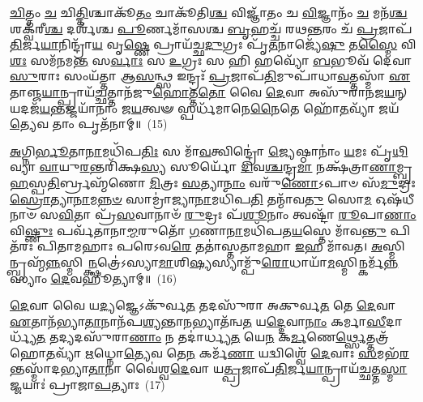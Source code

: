 {\anuvakamend[{𑌯𑌥𑍍𑌸𑍍𑌵𑍇𑌨᳴ 𑌸𑌾𑌰\-\ul{𑌸𑍍𑌵}\-𑌤𑍀𑌮𑌾 𑌲᳴𑌭𑍇\-\ul{𑌤} 𑌯𑌃 𑌕𑌾𑌮𑌾᳴𑌯 \ul{𑌤𑍍𑌵𑌾} 𑌕𑌾𑌮𑍋\-𑌽\-\ul{𑌪} 𑌇\-\ul{𑌤𑍍𑌯}\-𑌭𑍍𑌰𑍋 𑌦𑍍𑌵𑌿𑌚᳴𑌤𑍍𑌵𑌾𑌰𑌿𑍞𑌶𑌚𑍍𑌚}]}%

\-\ul{𑌚𑌿}\-𑌤𑍍𑌤𑌂 \ul{𑌚} 𑌚𑌿\-\ul{𑌤𑍍𑌤𑌿}\-𑌶𑍍𑌚𑌾𑌕𑍂᳴\-\ul{𑌤𑌂} 𑌚𑌾𑌕𑍂᳴𑌤𑌿\-\ul{𑌶𑍍𑌚} 𑌵𑌿𑌜𑍍𑌞𑌾᳴𑌤𑌂 𑌚 \ul{𑌵𑌿}\-𑌜𑍍𑌞𑌾𑌨𑌂᳴ \ul{𑌚} 𑌮𑌨᳴\-\ul{𑌶𑍍𑌚} 𑌶𑌕𑍍𑌵᳴𑌰𑍀\-\ul{𑌶𑍍𑌚} 𑌦𑌰𑍍\mbox{}𑌶᳴𑌶𑍍𑌚 \ul{𑌪𑍂}\-𑌰𑍍𑌣𑌮𑌾᳴𑌸𑌶𑍍𑌚 \ul{𑌬𑍃}\-𑌹𑌚𑍍𑌚᳴ 𑌰𑌥\-\ul{𑌨𑍍𑌤}\-𑌰𑌂 𑌚᳴ \ul{𑌪𑍍𑌰}\-𑌜𑌾𑌪᳴\-\ul{𑌤𑌿}\-𑌰𑍍𑌜\-\ul{𑌯𑌾}\-𑌨𑌿𑌨𑍍𑌦𑍍𑌰𑌾᳴\-\ul{𑌯} 𑌵𑍃\-\ul{𑌷𑍍𑌣𑍇} 𑌪𑍍𑌰𑌾𑌯᳴𑌚𑍍𑌛\-\ul{𑌦𑍁}\-𑌗𑍍𑌰𑌃 𑌪𑍃᳴\-\ul{𑌤}\-𑌨𑌾𑌜𑍍𑌯𑍇᳴\-\ul{𑌷𑍁} 𑌤\-\ul{𑌸𑍍𑌮𑍈} 𑌵𑌿\-\ul{𑌶𑌃} 𑌸𑌮᳴𑌨𑌮\-\ul{𑌨𑍍𑌤} 𑌸\-\ul{𑌰𑍍𑌵𑌾𑌃} 𑌸 \ul{𑌉}\-𑌗𑍍𑌰𑌃 𑌸 𑌹𑌿 𑌹𑌵𑍍𑌯𑍋᳴ \ul{𑌬}\-𑌭𑍂𑌵᳴ 𑌦𑍇𑌵𑌾\-\ul{𑌸𑍁}\-𑌰𑌾𑌃 𑌸𑌂𑌯᳴𑌤𑍍𑌤𑌾 𑌆\-\ul{𑌸}\-𑌨𑍍𑌥𑍍𑌸 𑌇𑌨𑍍𑌦𑍍𑌰𑌃᳴ \ul{𑌪𑍍𑌰}\-𑌜𑌾𑌪᳴\-\ul{𑌤𑌿}\-𑌮𑍁𑌪𑌾᳴𑌧𑌾\-\ul{𑌵}\-𑌤𑍍𑌤𑌸𑍍𑌮𑌾᳴ \ul{𑌏}\-𑌤𑌾𑌞𑍍𑌜\-\ul{𑌯𑌾}\-𑌨𑍍𑌪𑍍𑌰𑌾𑌯᳴\-\ul{𑌚𑍍𑌛}\-𑌤𑍍𑌤𑌾𑌨᳴𑌜𑍁\-\ul{𑌹𑍋}\-𑌤𑍍𑌤\-\ul{𑌤𑍋} 𑌵𑍈 \ul{𑌦𑍇}\-𑌵𑌾 𑌅𑌸𑍁᳴𑌰𑌾𑌨𑌜\-\ul{𑌯}\-𑌨𑍍 𑌯\-𑌦𑌜᳴\-\ul{𑌯}\-𑌨𑍍𑌤𑌜𑍍𑌜𑌯𑌾᳴𑌨𑌾𑌂 𑌜\-\ul{𑌯}\-𑌤𑍍𑌵𑍟 𑌸𑍍𑌪𑌰𑍍𑌧᳴𑌮𑌾𑌨𑍇\-\ul{𑌨𑍈}\-𑌤𑍇 𑌹𑍋᳴\-\ul{𑌤}\-𑌵𑍍𑌯𑌾᳴ 𑌜𑌯᳴\-\ul{𑌤𑍍𑌯𑍇}\-𑌵 𑌤𑌾𑌂 𑌪𑍃𑌤᳴𑌨𑌾𑌮𑍍॥~(15)

{\anuvakamend[{𑌉\-\ul{𑌪} 𑌪𑌞𑍍𑌚᳴𑌵𑌿𑍞𑌶𑌤𑌿𑌶𑍍𑌚}]}%

\-\ul{𑌅}\-𑌗𑍍𑌨𑌿\-\ul{𑌰𑍍𑌭𑍂}\-𑌤𑌾\-\ul{𑌨𑌾}\-𑌮𑌧𑌿᳴𑌪\-\ul{𑌤𑌿𑌃} 𑌸 𑌮𑌾᳴\-\ul{𑌵}\-𑌤𑍍𑌵𑌿𑌨𑍍𑌦𑍍𑌰𑍋॑ \ul{𑌜𑍍𑌯𑍇}\-𑌷𑍍𑌠𑌾𑌨𑌾𑌂॑ \ul{𑌯}\-𑌮𑌃 𑌪𑍃᳴\-\ul{𑌥𑌿}\-𑌵𑍍𑌯𑌾 \ul{𑌵𑌾}\-𑌯𑍁\-\ul{𑌰}\-𑌨𑍍𑌤𑌰𑌿᳴𑌕𑍍𑌷\-\ul{𑌸𑍍𑌯} 𑌸𑍂𑌰𑍍𑌯𑍋᳴ \ul{𑌦𑌿}\-𑌵\-\ul{𑌶𑍍𑌚}\-𑌨𑍍𑌦𑍍𑌰\-\ul{𑌮𑌾} 𑌨𑌕𑍍𑌷᳴𑌤𑍍𑌰𑌾\-\ul{𑌣𑌾}\-𑌮𑍍𑌬𑍃\-\ul{𑌹}\-𑌸𑍍𑌪\-\ul{𑌤𑌿}\-𑌰𑍍𑌬𑍍𑌰𑌹𑍍𑌮᳴𑌣𑍋 \ul{𑌮𑌿}\-𑌤𑍍𑌰𑌃 \ul{𑌸}\-𑌤𑍍𑌯𑌾\-\ul{𑌨𑌾𑌂} 𑌵𑌰𑍁᳴\-\ul{𑌣𑍋}\-\-𑌽𑌪𑌾𑍞 𑌸᳴\-\ul{𑌮𑍁}\-𑌦𑍍𑌰𑌃 \ul{𑌸𑍍𑌰𑍋}\-𑌤𑍍𑌯𑌾\-\ul{𑌨𑌾}\-𑌮\-\ul{𑌨𑍍𑌨}\-\-\ul{𑍞} 𑌸𑌾𑌮𑍍𑌰𑌾॑𑌜𑍍𑌯𑌾\-\ul{𑌨𑌾}\-𑌮𑌧𑌿᳴𑌪\-\ul{𑌤𑌿} 𑌤𑌨𑍍𑌮𑌾᳴𑌵\-\ul{𑌤𑍁} 𑌸𑍋\-\ul{𑌮} 𑌓𑌷᳴𑌧𑍀𑌨𑌾𑍞 𑌸\-\ul{𑌵𑌿}\-𑌤𑌾 𑌪𑍍𑌰᳴\-\ul{𑌸}\-𑌵𑌾𑌨𑌾𑍞᳴ \ul{𑌰𑍁}\-𑌦𑍍𑌰𑌃 𑌪᳴\-\ul{𑌶𑍂}\-𑌨𑌾𑌂 𑌤𑍍𑌵𑌷𑍍𑌟𑌾᳴ \ul{𑌰𑍂}\-𑌪𑌾\-\ul{𑌣𑌾𑌂} 𑌵𑌿\-\ul{𑌷𑍍𑌣𑍁𑌃} 𑌪𑌰𑍍𑌵᳴𑌤𑌾𑌨𑌾\-\ul{𑌮𑍍𑌮}\-𑌰𑍁𑌤𑍋᳴ \ul{𑌗}\-𑌣𑌾\-\ul{𑌨𑌾}\-𑌮𑌧𑌿᳴𑌪𑌤\-\ul{𑌯}\-𑌸𑍍𑌤𑍇 𑌮𑌾᳴𑌵\-\ul{𑌨𑍍𑌤𑍁} 𑌪𑌿𑌤᳴𑌰𑌃 𑌪𑌿𑌤𑌾𑌮𑌹𑌾𑌃 𑌪𑌰𑍇\-𑌽𑌵\-\ul{𑌰𑍇} 𑌤𑌤𑌾॑𑌸𑍍𑌤𑌤𑌾𑌮𑌹𑌾 \ul{𑌇}\-𑌹 𑌮𑌾᳴𑌵𑌤। \ul{𑌅}\-𑌸𑍍𑌮𑌿𑌨𑍍𑌬𑍍𑌰𑌹𑍍𑌮᳴\-\ul{𑌨𑍍𑌨}\-𑌸𑍍𑌮𑌿\-\ul{𑌨𑍍𑌕𑍍𑌷}\-𑌤𑍍𑌰𑍇॑\-𑌽𑌸𑍍𑌯𑌾\-\ul{𑌮𑌾}\-𑌶𑌿\-\ul{𑌷𑍍𑌯}\-𑌸𑍍𑌯𑌾𑌮𑍍𑌪𑍁᳴\-\ul{𑌰𑍋}\-𑌧𑌾𑌯𑌾᳴\-\-\ul{𑌮}\-𑌸𑍍𑌮𑌿𑌨𑍍𑌕𑌰𑍍𑌮᳴\-\ul{𑌨𑍍𑌨}\-𑌸𑍍𑌯𑌾𑌂 \ul{𑌦𑍇}\-𑌵𑌹𑍂॑𑌤𑍍𑌯𑌾𑌮𑍍॥~(16)

{\anuvakamend[{\-\ul{𑌅}\-\-\ul{𑌵}\-\-\ul{𑌰𑍇} \ul{𑌸}\-𑌪𑍍𑌤𑌦᳴𑌶 𑌚}]}%

\-\ul{𑌦𑍇}\-𑌵𑌾 𑌵𑍈 𑌯\-\ul{𑌦𑍍𑌯}\-𑌜𑍍𑌞𑍇\-𑌽𑌕𑍁᳴𑌰𑍍𑌵\-\ul{𑌤} 𑌤𑌦𑌸𑍁᳴𑌰𑌾 𑌅𑌕𑍁𑌰𑍍𑌵\-\ul{𑌤} 𑌤𑍇 \ul{𑌦𑍇}\-𑌵𑌾 \ul{𑌏}\-𑌤𑌾𑌨᳴𑌭𑍍𑌯𑌾\-\ul{𑌤𑌾}\-𑌨𑌾𑌨᳴𑌪\-\ul{𑌶𑍍𑌯}\-𑌨𑍍𑌤𑌾\-\ul{𑌨}\-𑌭𑍍𑌯𑌾𑌤᳴𑌨𑍍𑌵\-\ul{𑌤} 𑌯\-\ul{𑌦𑍍𑌦𑍇}\-𑌵𑌾\-\ul{𑌨𑌾𑌂} 𑌕𑌰𑍍𑌮𑌾\-\ul{𑌸𑍀}\-𑌦𑌾𑌰𑍍𑌧𑍍𑌯᳴\-\ul{𑌤} 𑌤𑌦𑍍𑌯𑌦𑌸𑍁᳴𑌰𑌾\-\ul{𑌣𑌾𑌂} 𑌨 𑌤𑌦𑌾॑𑌰𑍍𑌧𑍍𑌯\-\ul{𑌤} 𑌯𑍇\-\ul{𑌨} 𑌕\-\ul{𑌰𑍍𑌮}\-𑌣𑍇\-\ul{𑌰𑍍𑌥𑍍𑌸𑍇}\-𑌤𑍍𑌤𑌤𑍍𑌰᳴ 𑌹𑍋\-\ul{𑌤}\-𑌵𑍍𑌯𑌾᳴ \ul{𑌋}\-𑌧𑍍𑌨𑍋\-\ul{𑌤𑍍𑌯𑍇}\-𑌵 𑌤𑍇\-\ul{𑌨} 𑌕𑌰𑍍𑌮᳴\-\ul{𑌣𑌾} 𑌯𑌦𑍍𑌵𑌿𑌶𑍍𑌵𑍇᳴ \ul{𑌦𑍇}\-𑌵𑌾𑌃 \ul{𑌸}\-𑌮𑌭᳴\-\ul{𑌰}\-𑌨𑍍𑌤𑌸𑍍𑌮𑌾᳴𑌦𑌭𑍍𑌯𑌾\-\ul{𑌤𑌾}\-𑌨𑌾 𑌵𑍈॑𑌶𑍍𑌵\-\ul{𑌦𑍇}\-𑌵𑌾 𑌯\-\ul{𑌤𑍍𑌪𑍍𑌰}\-𑌜𑌾𑌪᳴\-\ul{𑌤𑌿}\-𑌰𑍍𑌜\-\ul{𑌯𑌾}\-𑌨𑍍𑌪𑍍𑌰𑌾𑌯᳴\-\ul{𑌚𑍍𑌛}\-𑌤𑍍𑌤\-\ul{𑌸𑍍𑌮𑌾}\-𑌜𑍍𑌜𑌯𑌾𑌃॑ 𑌪𑍍𑌰𑌾𑌜𑌾\-\ul{𑌪}\-𑌤𑍍𑌯𑌾𑌃~(17)

